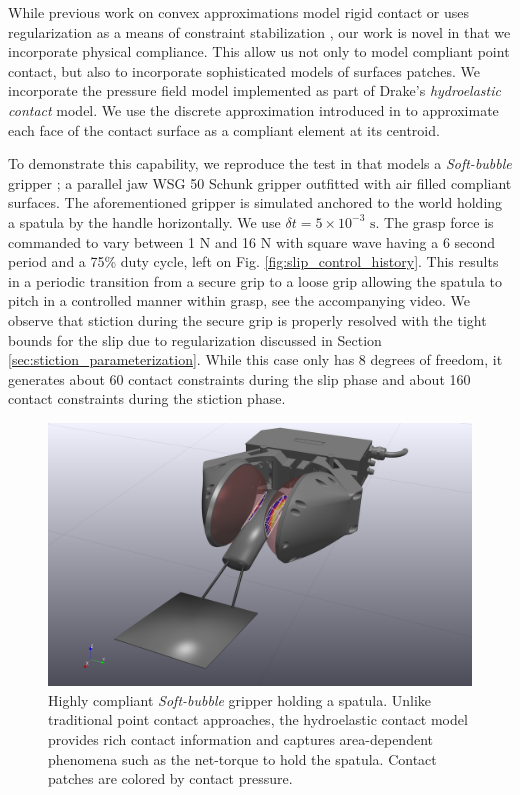 While previous work on convex approximations model rigid contact
\cite{bib:anitescu2006,bib:mazhar2014} or uses regularization as a means of
constraint stabilization \cite{bib:todorov2014}, our work is novel in that we
incorporate physical compliance. This allow us not only to model compliant point
contact, but also to incorporate sophisticated models of surfaces patches. We
incorporate the pressure field model \cite{bib:elandt2019pressure} implemented
as part of Drake's \cite{bib:drake} \emph{hydroelastic contact} model. We use
the discrete approximation introduced in \cite{bib:masterjohn2021discrete}
to approximate each face of the contact surface as a compliant element at its
centroid.

To demonstrate this capability, we reproduce the test in \cite{bib:masterjohn2021discrete} that models a \emph{Soft-bubble} gripper
\cite{bib:kuppuswamy2020soft}; a parallel jaw WSG 50 Schunk gripper outfitted
with air filled compliant surfaces. The aforementioned gripper is simulated
anchored to the world holding a spatula by the handle horizontally. We use $\delta t=5\times 10^{-3}\text{ s}$. The grasp
force is commanded to vary between 1 N and 16 N with square wave having a 6
second period and a 75\% duty cycle, left on Fig.
\ref{fig:slip_control_history}. This results in a periodic transition from a
secure grip to a loose grip allowing the spatula to pitch in a controlled manner
within grasp, see the accompanying video. We observe that stiction during the
secure grip is properly resolved with the tight bounds for the slip due to
regularization discussed in Section \ref{sec:stiction_parameterization}. While
this case only has 8 degrees of freedom, it generates about 60 contact
constraints during the slip phase and about 160 contact constraints during the
stiction phase.

\begin{figure}[!h]
	\centering
	\includegraphics[width=0.9\columnwidth]{figures/slip_control/slip_control_single_frame.png}
	\caption{\label{fig:slip_control_frame} 
	Highly compliant \emph{Soft-bubble} gripper \cite{bib:kuppuswamy2020soft}
	holding a spatula. Unlike traditional point contact approaches, the
	hydroelastic contact model provides rich contact information and captures
	area-dependent phenomena such as the net-torque to hold the spatula. Contact
	patches are colored by contact pressure.}
\end{figure}

